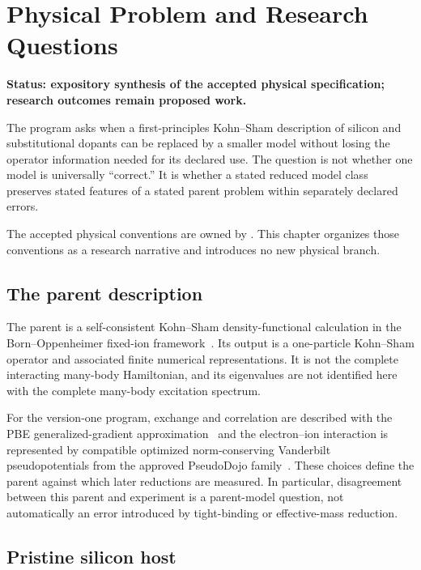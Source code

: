 \chapter{Physical Problem and Research Questions}
\label{ch:physical-problem}

\textbf{Status: expository synthesis of the accepted physical specification;
research outcomes remain proposed work.}

The program asks when a first-principles Kohn--Sham description of silicon and
substitutional dopants can be replaced by a smaller model without losing the
operator information needed for its declared use. The question is not whether
one model is universally ``correct.'' It is whether a stated reduced model
class preserves stated features of a stated parent problem within separately
declared errors.

The accepted physical conventions are owned by
. This chapter
organizes those conventions as a research narrative and introduces no new
physical branch.

\section{The parent description}

The parent is a self-consistent Kohn--Sham density-functional calculation in
the Born--Oppenheimer fixed-ion framework~\cite{hohenberg1964,kohn1965}. Its
output is a one-particle
Kohn--Sham operator and associated finite numerical representations. It is not
the complete interacting many-body Hamiltonian, and its eigenvalues are not
identified here with the complete many-body excitation spectrum.

For the version-one program, exchange and correlation are described with the
PBE generalized-gradient approximation~\cite{perdew1996} and the electron--ion
interaction is represented by compatible optimized norm-conserving Vanderbilt
pseudopotentials from the approved PseudoDojo
family~\cite{hamann2013,vansetten2018}. These choices define the
parent against which later reductions are measured. In particular, disagreement
between this parent and experiment is a parent-model question, not automatically
an error introduced by tight-binding or effective-mass reduction.

\section{Pristine silicon host}

